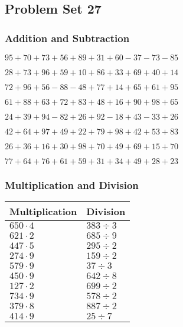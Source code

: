 \hypertarget{problem-set-27}{%
\subsection{Problem Set 27}\label{problem-set-27}}

\hypertarget{addition-and-subtraction}{%
\subsubsection{Addition and
Subtraction}\label{addition-and-subtraction}}

\(95+70+73+56+89+31+60-37-73-85\)

\(28+73+96+59+10+86+33+69+40+14\)

\(72+96+56-88-48+77+14+65+61+95\)

\(61+88+63+72+83+48+16+90+98+65\)

\(24+39+94-82+26+92-18+43-33+26\)

\(42+64+97+49+22+79+98+42+53+83\)

\(26+36+16+30+98+70+49+69+15+70\)

\(77+64+76+61+59+31+34+49+28+23\)

\hypertarget{multiplication-and-division}{%
\subsubsection{Multiplication and
Division}\label{multiplication-and-division}}

\begin{longtable}[]{@{}ll@{}}
\toprule
Multiplication & Division\tabularnewline
\midrule
\endhead
\(650\cdot4\) & \(383÷3\)\tabularnewline
\(621\cdot2\) & \(685÷9\)\tabularnewline
\(447\cdot5\) & \(295÷2\)\tabularnewline
\(274\cdot9\) & \(159÷2\)\tabularnewline
\(579\cdot9\) & \(37÷3\)\tabularnewline
\(450\cdot9\) & \(642÷8\)\tabularnewline
\(127\cdot2\) & \(699÷2\)\tabularnewline
\(734\cdot9\) & \(578÷2\)\tabularnewline
\(379\cdot8\) & \(887÷2\)\tabularnewline
\(414\cdot9\) & \(25÷7\)\tabularnewline
\bottomrule
\end{longtable}
